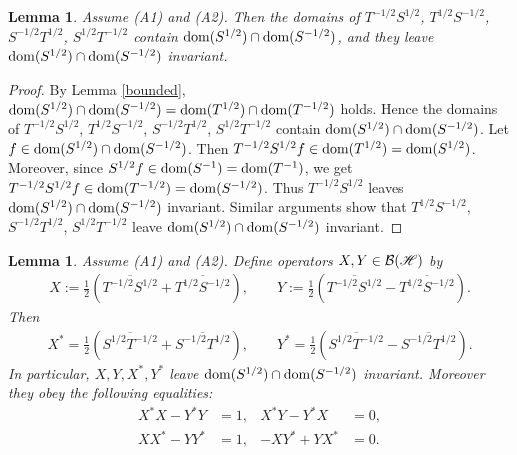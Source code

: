 \documentclass[12pt]{article}
\theoremstyle{plain}
\newtheorem{lem}[theorem]{\bf Lemma}
\numberwithin{equation}{section}
\theoremstyle{remark}
\begin{document}
\begin{lem}\label{domain}
Assume (A1) and (A2). 
Then the domains of $T^{-1/2}S^{1/2}$, $T^{1/2}S^{-1/2}$, $S^{-1/2}T^{1/2}$, $S^{1/2}T^{-1/2}$ 
contain $\mathop{\mathrm{dom}}(S^{1/2})\cap\mathop{\mathrm{dom}}(S^{-1/2})$,
and they leave $\mathop{\mathrm{dom}}(S^{1/2})\cap\mathop{\mathrm{dom}}(S^{-1/2})$ invariant.
\end{lem}

\begin{proof}
By Lemma \ref{bounded}, $\mathop{\mathrm{dom}}(S^{1/2})\cap\mathop{\mathrm{dom}}(S^{-1/2})=\mathop{\mathrm{dom}}(T^{1/2})\cap\mathop{\mathrm{dom}}(T^{-1/2})$ holds.
Hence the domains of $T^{-1/2}S^{1/2}$, $T^{1/2}S^{-1/2}$, $S^{-1/2}T^{1/2}$, $S^{1/2}T^{-1/2}$ contain $\mathop{\mathrm{dom}}(S^{1/2})\cap\mathop{\mathrm{dom}}(S^{-1/2})$.
Let $f\in\mathop{\mathrm{dom}}(S^{1/2})\cap\mathop{\mathrm{dom}}(S^{-1/2})$.
Then $T^{-1/2}S^{1/2}f \in \mathop{\mathrm{dom}}(T^{1/2}) = \mathop{\mathrm{dom}}(S^{1/2})$. 
Moreover, since $S^{1/2}f \in \mathop{\mathrm{dom}}(S^{-1}) = \mathop{\mathrm{dom}}(T^{-1})$, we get $T^{-1/2}S^{1/2}f \in \mathop{\mathrm{dom}}(T^{-1/2}) = \mathop{\mathrm{dom}}(S^{-1/2})$.
Thus $T^{-1/2}S^{1/2}$ leaves $\mathop{\mathrm{dom}}(S^{1/2})\cap\mathop{\mathrm{dom}}(S^{-1/2})$ invariant.
Similar arguments show that $T^{1/2}S^{-1/2}$, $S^{-1/2}T^{1/2}$, $S^{1/2}T^{-1/2}$ leave $\mathop{\mathrm{dom}}(S^{1/2})\cap\mathop{\mathrm{dom}}(S^{-1/2})$ invariant.
\end{proof}

\begin{lem}\label{X and Y}
Assume (A1) and (A2).
Define operators $X,Y\in\mathcal{B}(\mathscr{H})$ by
\begin{align}
 X := \frac{1}{2} \left(\overline{T^{-1/2}S^{1/2}}+\overline{T^{1/2}S^{-1/2}}\right), \qquad 
 Y := \frac{1}{2}\left(\overline{T^{-1/2}S^{1/2}}-\overline{T^{1/2}S^{-1/2}}\right).
  \label{defXY}
\end{align}
Then 
\begin{align*}
 X^* = \frac{1}{2} \left(\overline{S^{1/2}T^{-1/2}}+\overline{S^{-1/2}T^{1/2}}\right), \qquad 
 Y^* = \frac{1}{2} \left(\overline{S^{1/2}T^{-1/2}}-\overline{S^{-1/2}T^{1/2}}\right).  
\end{align*}
In particular, $X, Y, X^*, Y^*$ leave $\mathop{\mathrm{dom}}(S^{1/2})\cap\mathop{\mathrm{dom}}(S^{-1/2})$ invariant.
Moreover they obey the following equalities:
\begin{align*}
 X^*X-Y^*Y &= 1, &  X^*Y-Y^*X &= 0,\\
 XX^*-YY^* &= 1, & -XY^*+YX^* &= 0.
\end{align*}
\end{lem}
\end{document}
